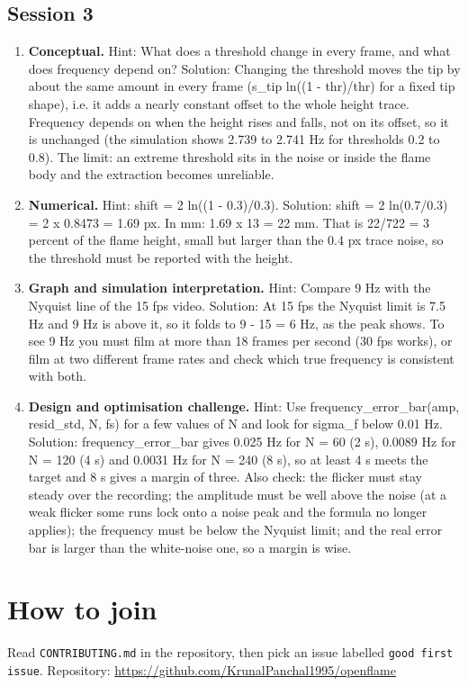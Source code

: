 \documentclass[11pt,a4paper]{article}
\begin{document}
\subsection*{Session 3}
\begin{enumerate}[nosep]
\item \textbf{Conceptual.} Hint: What does a threshold change in every frame, and what does frequency depend on? Solution: Changing the threshold moves the tip by about the same amount in every frame (s\_tip ln((1 - thr)/thr) for a fixed tip shape), i.e. it adds a nearly constant offset to the whole height trace. Frequency depends on when the height rises and falls, not on its offset, so it is unchanged (the simulation shows 2.739 to 2.741 Hz for thresholds 0.2 to 0.8). The limit: an extreme threshold sits in the noise or inside the flame body and the extraction becomes unreliable.
\item \textbf{Numerical.} Hint: shift = 2 ln((1 - 0.3)/0.3). Solution: shift = 2 ln(0.7/0.3) = 2 x 0.8473 = 1.69 px. In mm: 1.69 x 13 = 22 mm. That is 22/722 = 3 percent of the flame height, small but larger than the 0.4 px trace noise, so the threshold must be reported with the height.
\item \textbf{Graph and simulation interpretation.} Hint: Compare 9 Hz with the Nyquist line of the 15 fps video. Solution: At 15 fps the Nyquist limit is 7.5 Hz and 9 Hz is above it, so it folds to \textbar{}9 - 15\textbar{} = 6 Hz, as the peak shows. To see 9 Hz you must film at more than 18 frames per second (30 fps works), or film at two different frame rates and check which true frequency is consistent with both.
\item \textbf{Design and optimisation challenge.} Hint: Use frequency\_error\_bar(amp, resid\_std, N, fs) for a few values of N and look for sigma\_f below 0.01 Hz. Solution: frequency\_error\_bar gives 0.025 Hz for N = 60 (2 s), 0.0089 Hz for N = 120 (4 s) and 0.0031 Hz for N = 240 (8 s), so at least 4 s meets the target and 8 s gives a margin of three. Also check: the flicker must stay steady over the recording; the amplitude must be well above the noise (at a weak flicker some runs lock onto a noise peak and the formula no longer applies); the frequency must be below the Nyquist limit; and the real error bar is larger than the white-noise one, so a margin is wise.
\end{enumerate}

\section{How to join}
Read \texttt{CONTRIBUTING.md} in the repository, then pick an issue labelled \texttt{good first issue}. Repository: \url{https://github.com/KrunalPanchal1995/openflame}
\end{document}
